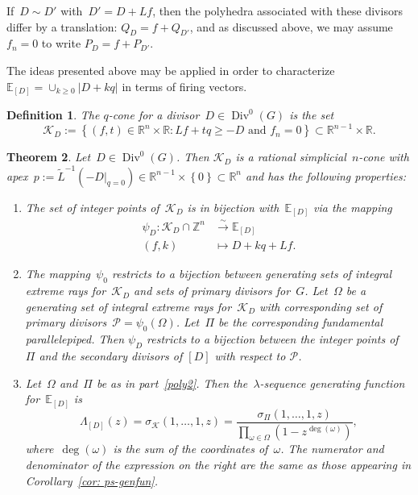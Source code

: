 \documentclass{amsart}
\newtheorem{thm}{Theorem}[section]
\newtheorem{Definition}[thm]{Definition}
\newenvironment{defn}
  {\begin{Definition}\rm}{\end{Definition}}
\DeclareMathOperator{\Div}{Div}
\newcommand{\primary}{\mathcal{P}}
\newcommand{\Z}{\mathbb{Z}}
\newcommand{\R}{\mathbb{R}}
\newcommand{\E}{\mathbb{E}}
\newcommand{\tL}{\tilde{L}}
\newcommand{\K}{\mathcal{K}}
\begin{document}
If~$D\sim D'$ with~$D'=D+Lf$, then the polyhedra associated with these divisors
differ by a translation: $Q_{D}=f+Q_{D'}$, and as discussed above, we may
assume~$f_n=0$ to write $P_{D}=f+P_{D'}$.

The ideas presented above may be applied in order to
characterize~$\E_{[D]}=\cup_{k\geq0}|D+kq|$ in terms of firing vectors.
\begin{defn} The {\em $q$-cone} for a divisor~$D\in\Div^0(G)$ is the set
\[
  \K_D := \left\{ (f,t)\in\R^n\times\R : Lf+tq\geq -D \text{ and } f_n=0\right\}
\subset\R^{n-1}\times\R.
\] 
\end{defn}

\begin{thm}\label{thm: poly} Let~$D\in\Div^0(G)$. 
Then $\K_D$ is a rational simplicial~$n$-cone with
      apex~$p:=\tL^{-1}(-D|_{q=0})\in\R^{n-1}\times\left\{ 0
      \right\}\subset\R^{n}$ and has the following properties: 
  \begin{enumerate}[label=\rm{(\arabic*)},leftmargin=*]
    \item\label{poly1} The set of integer points of~$\K_D$ is in bijection
      with~$\E_{[D]}$ via the mapping
      \begin{align*}
	\psi_D\colon\K_D\cap\Z^{n}&\xrightarrow{\sim}\E_{[D]}\\
	(f,k)\ &\mapsto D+kq+Lf.
      \end{align*}

    \item\label{poly2} The mapping~$\psi_0$ restricts to a bijection between
      generating sets of integral extreme rays for~$\K_D$ and sets of primary
      divisors for~$G$.  Let~$\Omega$ be a generating set of integral extreme
      rays for~$\K_D$ with corresponding set of primary
      divisors~$\primary=\psi_0(\Omega)$.  Let~$\Pi$ be the corresponding
      fundamental parallelepiped.
      Then $\psi_D$ restricts to a bijection between the integer
      points of~$\Pi$ and the secondary divisors of $[D]$ with respect to
      $\primary$.  
    \item\label{poly3} Let~$\Omega$ and~$\Pi$ be as in part~\ref{poly2}.  Then the~$\lambda$-sequence generating function for~$\E_{[D]}$ is
      \[
	\Lambda_{[D]}(z)=\sigma_{\K}(1,\dots,1,z)=\frac{\sigma_{\Pi}(1,\dots,1,z)}{\prod_{\omega\in\Omega}(1-z^{\deg(\omega)})},
      \]
      where~$\deg(\omega)$ is the sum of the coordinates of~$\omega$.  The numerator and
      denominator of the expression on the right are the same as those appearing
      in Corollary~\ref{cor: ps-genfun}.
  \end{enumerate}
\end{thm}
\end{document}
